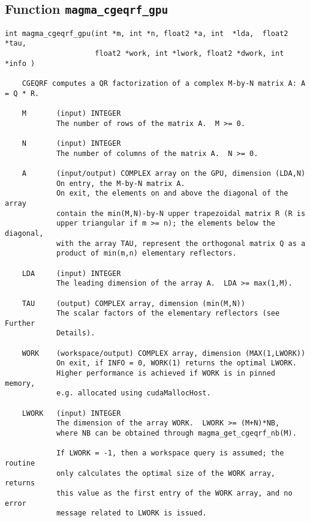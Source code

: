 \documentclass[10pt]{book}
\begin{document}

\newpage
\subsection{Function {\tt {\bf magma\_cgeqrf\_gpu}}}
\begin{verbatim}
int magma_cgeqrf_gpu(int *m, int *n, float2 *a, int  *lda,  float2  *tau,
                     float2 *work, int *lwork, float2 *dwork, int *info )
  
    CGEQRF computes a QR factorization of a complex M-by-N matrix A: A = Q * R.   

    M       (input) INTEGER   
            The number of rows of the matrix A.  M >= 0.   

    N       (input) INTEGER   
            The number of columns of the matrix A.  N >= 0.   

    A       (input/output) COMPLEX array on the GPU, dimension (LDA,N)   
            On entry, the M-by-N matrix A.   
            On exit, the elements on and above the diagonal of the array   
            contain the min(M,N)-by-N upper trapezoidal matrix R (R is   
            upper triangular if m >= n); the elements below the diagonal,   
            with the array TAU, represent the orthogonal matrix Q as a   
            product of min(m,n) elementary reflectors.

    LDA     (input) INTEGER   
            The leading dimension of the array A.  LDA >= max(1,M).   

    TAU     (output) COMPLEX array, dimension (min(M,N))   
            The scalar factors of the elementary reflectors (see Further   
            Details).   

    WORK    (workspace/output) COMPLEX array, dimension (MAX(1,LWORK))   
            On exit, if INFO = 0, WORK(1) returns the optimal LWORK.   
            Higher performance is achieved if WORK is in pinned memory, 
            e.g. allocated using cudaMallocHost.

    LWORK   (input) INTEGER   
            The dimension of the array WORK.  LWORK >= (M+N)*NB,   
            where NB can be obtained through magma_get_cgeqrf_nb(M).

            If LWORK = -1, then a workspace query is assumed; the routine   
            only calculates the optimal size of the WORK array, returns   
            this value as the first entry of the WORK array, and no error   
            message related to LWORK is issued.   


\end{verbatim}
\end{document}
